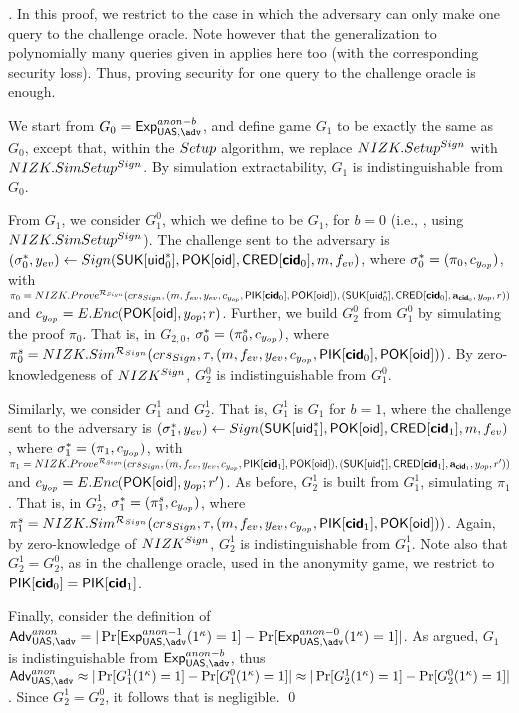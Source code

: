 \begin{proof}[]
  In this proof, we restrict to the case in which the adversary can only make
  one query to the challenge oracle. Note however that the generalization to
  polynomially many queries given in \cite{bsz05} applies here too (with the
  corresponding security loss). Thus, proving security for one query to the
  challenge oracle is enough.

  We start from $G_0=\ExpAnonb$, and define game $G_1$ to be exactly the same
  as $G_0$, except that, within the $Setup$ algorithm, we replace
  $NIZK.Setup^{Sign}$ with $NIZK.SimSetup^{Sign}$. By simulation
  extractability, $G_1$ is indistinguishable from $G_0$.
  
  From $G_1$, we consider $G^0_1$, which we define to be $G_1$, for $b=0$
  (i.e., \ExpAnonz, using $NIZK.SimSetup^{Sign}$). The challenge sent to the
  adversary is $(\mathsf{\sigma}^*_0,y_{ev}) \gets Sign(\mathsf{S}\mathsf{UK}[\mathsf{uid}^*_0],\mathsf{P}\mathsf{OK}[\mathsf{oid}],
  \mathsf{CRED}[\boldsymbol{\mathsf{cid}}_0],m,f_{ev})$, where $\mathsf{\sigma}^*_0 = (\pi_0,c_{y_{op}})$, with
  $\pi_0 = NIZK.Prove^{\mathcal{R}_{Sign}}(crs_{Sign},(m,f_{ev},y_{ev},
  c_{y_{op}},\mathsf{P}\mathsf{IK}[\boldsymbol{\mathsf{cid}}_0],\mathsf{P}\mathsf{OK}[\mathsf{oid}]),(\mathsf{S}\mathsf{UK}[\mathsf{uid}^*_0],
  \mathsf{CRED}[\boldsymbol{\mathsf{cid}}_0],\mathbf{a}_{\boldsymbol{\mathsf{cid}}_0},y_{op},r))$ and $c_{y_{op}} =
  E.Enc(\mathsf{P}\mathsf{OK}[\mathsf{oid}],y_{op};r)$.
  Further, we build $G_2^0$ from $G_1^0$ by simulating the proof $\pi_0$. That
  is, in $G_{2,0}$, $\mathsf{\sigma}^*_0 = (\pi_0^s,c_{y_{op}})$, where $\pi^s_0 =
  NIZK.Sim^{\mathcal{R}_{Sign}}(crs_{Sign},\tau,(m,f_{ev},y_{ev},
  c_{y_{op}},\mathsf{P}\mathsf{IK}[\boldsymbol{\mathsf{cid}}_0],\mathsf{P}\mathsf{OK}[\mathsf{oid}]))$. By zero-knowledgeness
  of $NIZK^{Sign}$, $G_2^0$ is indistinguishable from $G_1^0$.

  Similarly, we consider $G_1^1$ and $G_2^1$. That is, $G_1^1$ is $G_1$
  for $b=1$, where the challenge
  sent to the adversary is $(\mathsf{\sigma}^*_1,y_{ev}) \gets Sign(\mathsf{S}\mathsf{UK}[\mathsf{uid}^*_1],
  \mathsf{P}\mathsf{OK}[\mathsf{oid}],\mathsf{CRED}[\boldsymbol{\mathsf{cid}}_1],m,f_{ev})$, where $\mathsf{\sigma}^*_1 = (\pi_1,
  c_{y_{op}})$, with $\pi_1 = NIZK.Prove^{\mathcal{R}_{Sign}}(crs_{Sign},
  (m,f_{ev},y_{ev},c_{y_{op}},\mathsf{P}\mathsf{IK}[\boldsymbol{\mathsf{cid}}_1],\mathsf{P}\mathsf{OK}[\mathsf{oid}]),
  (\mathsf{S}\mathsf{UK}[\mathsf{uid}^*_1],\mathsf{CRED}[\boldsymbol{\mathsf{cid}}_1],\mathbf{a}_{\boldsymbol{\mathsf{cid}}_1},y_{op},r'))$ and $c_{y_{op}}
  = E.Enc(\mathsf{P}\mathsf{OK}[\mathsf{oid}],y_{op};r')$. As before, $G_2^1$ is built from $G_1^1$,
  simulating $\pi_1$. That is, in $G_2^1$, $\mathsf{\sigma}^*_1 = (\pi_1^s,c_{y_{op}})$,
  where $\pi^s_1 = NIZK.Sim^{\mathcal{R}_{Sign}}(crs_{Sign},\tau,(m,
  f_{ev},y_{ev},c_{y_{op}},\mathsf{P}\mathsf{IK}[\boldsymbol{\mathsf{cid}}_1],\mathsf{P}\mathsf{OK}[\mathsf{oid}]))$. Again, by
  zero-knowledge of $NIZK^{Sign}$, $G_2^1$ is indistinguishable from $G_1^1$.
  Note also that $G_2^1=G_2^0$, as in the challenge oracle, used in the
  anonymity game, we restrict to $\mathsf{P}\mathsf{IK}[\boldsymbol{\mathsf{cid}}_0] = \mathsf{P}\mathsf{IK}[\boldsymbol{\mathsf{cid}}_1]$.

  Finally, consider the definition of $\AdvAnon=|\Pr\lbrack
  \ExpAnono(1^\secpar)=1\rbrack-\Pr\lbrack\ExpAnonz(1^\secpar)=1\rbrack|$. As
  argued, $G_1$ is indistinguishable from $\ExpAnonb$, thus
  $\AdvAnon \approx |\Pr\lbrack G_1^1(1^\secpar)=1\rbrack-\Pr\lbrack
  G_1^0(1^\secpar)=1\rbrack| \approx
  |\Pr\lbrack G_2^1(1^\secpar)=1\rbrack-\Pr\lbrack
  G_2^0(1^\secpar)=1\rbrack|$. Since $G_2^1=G_2^0$, it follows that
  \AdvAnon is negligible.
  \qed
\end{proof}

